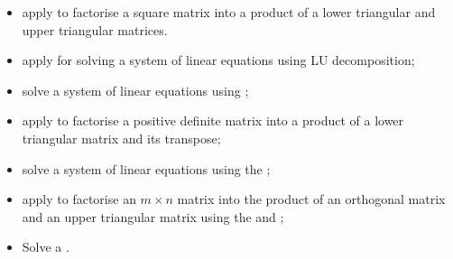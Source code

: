\documentclass[letterpaper,10pt,english]{jupyterBook}
\begin{document}
\begin{itemize}
\item {} 
\sphinxAtStartPar
apply {\hyperref[\detokenize{6_Direct_methods/6.1_LU_decomposition:lu-definition}]{}} to factorise a square matrix into a product of a lower triangular and upper triangular matrices.

\item {} 
\sphinxAtStartPar
apply {\hyperref[\detokenize{6_Direct_methods/6.1_LU_decomposition:crouts-method-section}]{}} for solving a system of linear equations using LU decomposition;

\item {} 
\sphinxAtStartPar
solve a system of linear equations using {\hyperref[\detokenize{6_Direct_methods/6.2_LUP_decomposition:partial-pivoting-section}]{}};

\item {} 
\sphinxAtStartPar
apply {\hyperref[\detokenize{6_Direct_methods/6.3_Cholesky_decomposition:cholesky-definition}]{}} to factorise a positive definite matrix into a product of a lower triangular matrix and its transpose;

\item {} 
\sphinxAtStartPar
solve a system of linear equations using the {\hyperref[\detokenize{6_Direct_methods/6.3_Cholesky_decomposition:cholesky-crout-method-section}]{}};

\item {} 
\sphinxAtStartPar
apply {\hyperref[\detokenize{6_Direct_methods/6.4_QR_decomposition:qr-section}]{}} to factorise an \(m\times n\) matrix into the product of an orthogonal matrix and an upper triangular matrix using the {\hyperref[\detokenize{6_Direct_methods/6.4_QR_decomposition:qr-gramschmidt-definition}]{}} and {\hyperref[\detokenize{6_Direct_methods/6.4_QR_decomposition:qr-householder-definition}]{}};

\item {} 
\sphinxAtStartPar
Solve a {\hyperref[\detokenize{6_Direct_methods/6.4_QR_decomposition:qr-crout-section}]{}}.

\end{itemize}
\end{document}
